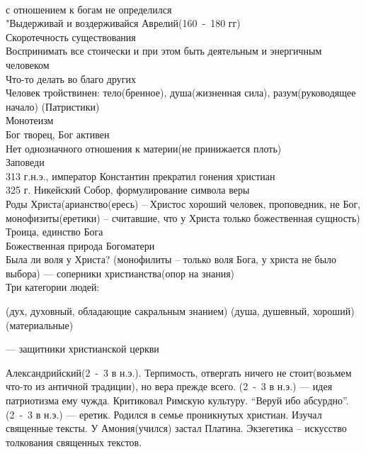 \documentclass[a4paper,12pt]{report} %
\begin{document}
\begin{itemize}
\begin{enumerate}
    \\с отношением к богам не определился
    \\"Выдерживай и воздерживайся
   Аврелий(160~-~180 гг)
    \\Скоротечность существования
    \\Воспринимать все стоически и при этом быть деятельным и энергичным
    человеком
    \\Что-то делать во благо других
    \\Человек тройствинен: тело(бренное), душа(жизненная сила),
    разум(руководящее начало)
   (Патристики)
    \\Монотеизм
    \\Бог творец, Бог активен
    \\Нет однозначного отношения к материи(не принижается плоть)
    \\Заповеди
    \\313 г.н.э., император Константин прекратил гонения христиан
    \\325 г. Никейский Собор, формулирование символа веры
    \\Роды Христа(арианство(ересь) -- Христос хороший человек, проповедник, не
    Бог, монофизиты(еретики) -- считавшие, что у Христа только
    божественная сущность)
    \\Троица, единство Бога
    \\Божественная природа Богоматери
    \\Была ли воля у Христа? (монофилиты -- только воля Бога, у христа не
    было выбора)
   --- соперники христианства(опор на знания)
    \\Три категории людей:
    \begin{itemize}
    (дух, духовный, обладающие сакральным знанием)
    (душа, душевный, хороший)
    (материальные)
    \end{itemize}
   --- защитники христианской церкви
    \begin{enumerate}
     Александрийский(2~-~3 в н.э.). Терпимость, отвергать
      ничего не стоит(возьмем что-то из античной традиции), но вера прежде
      всего.
    (2~-~3 в н.э.) --- идея патриотизма ему чужда. Критиковал Римскую
      культуру. ``Веруй ибо абсурдно''.
    (2~-~3 в н.э.) --- еретик. Родился в семье проникнутых
      христиан. Изучал священные тексты. У Амония(учился) застал
      Платина. Экзегетика -- искусство толкования священных текстов.

\end{enumerate}
\end{enumerate}
\end{itemize}
\end{document}
